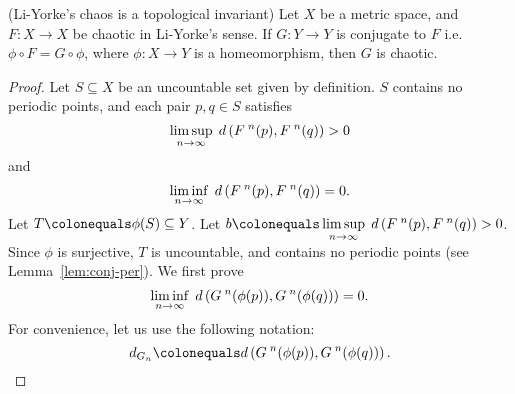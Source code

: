 \documentclass[10pt,draft,twoside]{book}
\begin{document}
\begin{theorem}
  (Li-Yorke's chaos is a topological invariant)
  Let $X$ be a metric space, and $F: X\to X$ be chaotic in Li-Yorke's sense.
  If $G: Y\to Y$ is conjugate to $F$ i.e. $\phi \circ F = G \circ \phi$, where $\phi: X \to Y$ is a homeomorphism, then $G$ is chaotic.
  \begin{proof}
    Let $S \subseteq X$ be an uncountable set given by definition.
    $S$ contains no periodic points, and each pair $p,q \in S$ satisfies
    \begin{equation*}
      \limsup\limits_{n \to \infty}\; d\left( F^{\;n}(p) , F^{\;n}(q) \right) > 0
    \end{equation*}
    and
    \begin{equation*}
      \liminf\limits_{n \to \infty}\; d\left( F^{\;n}(p) , F^{\;n}(q) \right) = 0.
    \end{equation*}
    Let $T \ceq \phi(S) \subseteq Y$.
    Let $b \ceq \limsup\limits_{n \to \infty}\; \metric{\itr{F}{n}(p) , \itr{F}{n}(q)} > 0$.
    Since $\phi$ is surjective, $T$ is uncountable, and contains no periodic points (see Lemma~\ref{lem:conj-per}).
    We first prove
    \begin{equation*}
      \liminf\limits_{n \to \infty}\; d\left( G^{\;n}(\phi(p)) , G^{\;n}(\phi(q)) \right) = 0.
    \end{equation*}
    For convenience, let us use the following notation:
    \begin{equation*}
      d_{G_n} \ceq \metric{\itr{G}{n}(\phi(p)) , \itr{G}{n}(\phi(q))}.
    \end{equation*}


\end{proof}
\end{theorem}
\end{document}
